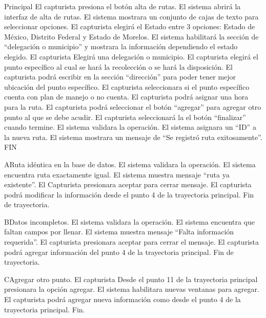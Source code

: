 \begin{UCtrayectoria}{Principal}
	\UCpaso El capturista presiona el botón alta de rutas.
	\UCpaso	El sistema abrirá la interfaz de alta de rutas.
	\UCpaso	El sistema  mostrara un conjunto de cajas de texto para seleccionar opciones.
	\UCpaso	El capturista elegirá el Estado entre 3 opciones: Estado de México, Distrito Federal y  Estado de Morelos.
	\UCpaso	El sistema habilitará la sección de “delegación o municipio” y mostrara la información dependiendo el estado elegido.
	\UCpaso	El capturista Elegirá una delegación o municipio.
	\UCpaso	El  capturista elegirá el punto específico al cual se hará la recolección o se hará la disposición. 
	\UCpaso	El capturista podrá escribir en la sección “dirección” para poder tener mejor ubicación del punto específico.
	\UCpaso	El capturista seleccionara si el punto específico cuenta con plan de manejo o no cuenta.
	\UCpaso	El capturista podrá asignar una hora para la ruta.
	\UCpaso	El capturista podrá seleccionar el botón “agregar” para agregar otro punto al que se debe acudir.
	\UCpaso	El capturista seleccionará la el botón “finalizar” cuando termine.
	\UCpaso	El sistema validara la operación. 
	\UCpaso El sistema asignara un “ID” a la nueva ruta.
	\UCpaso	El sistema mostrara un mensaje de “Se registró ruta exitosamente”.
	\UCpaso	FIN
\end{UCtrayectoria}
	
\begin{UCtrayectoriaA}{A}{Ruta idéntica en la base de datos.}
	\UCpaso El sistema validara la operación.
	\UCpaso	El sistema encuentra ruta exactamente igual.
	\UCpaso	El sistema muestra mensaje “ruta ya existente”.
	\UCpaso	El Capturista presionara aceptar para cerrar mensaje.
	\UCpaso	El capturista podrá modificar la información desde el punto 4 de la trayectoria principal.
	\UCpaso	Fin de trayectoria.
\end{UCtrayectoriaA}

\begin{UCtrayectoriaA}{B}{Datos incompletos.}
	\UCpaso El sistema validara la operación.
	\UCpaso	El sistema encuentra que faltan campos por llenar.
	\UCpaso	El sistema muestra mensaje “Falta información requerida”.
	\UCpaso	El capturista presionara aceptar para cerrar el mensaje.
	\UCpaso	El capturista podrá agregar información del punto 4 de la trayectoria principal.
	\UCpaso	Fin de trayectoria.
\end{UCtrayectoriaA}

\begin{UCtrayectoriaA}{C}{Agregar otro punto.}
	\UCpaso El capturista Desde el punto 11 de la trayectoria principal presionara la opción agregar.
	\UCpaso	El sistema habilitara nuevas ventanas para agregar.
	\UCpaso	El capturista podrá agregar nueva información como desde el punto 4 de la trayectoria principal.
	\UCpaso	Fin.
\end{UCtrayectoriaA}
		
